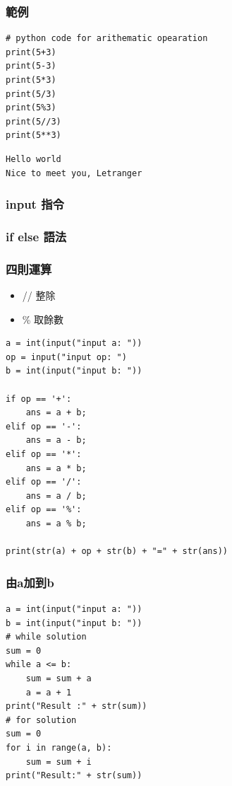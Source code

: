 \documentclass[a4paper,12pt]{article}
\begin{document}
\subsubsection{範例}
\label{sec:orgd1a297a}
\lstset{breaklines=true,language=Python,label= ,caption= ,captionpos=b,firstnumber=1,numbers=left}
\begin{lstlisting}
# python code for arithematic opearation
print(5+3)
print(5-3)
print(5*3)
print(5/3)
print(5%3)
print(5//3)
print(5**3)
\end{lstlisting}

\begin{verbatim}
Hello world
Nice to meet you, Letranger
\end{verbatim}

\subsubsection{input 指令}
\label{sec:org10aafd3}
\subsubsection{if else 語法}
\label{sec:org8dd342d}
\subsubsection{四則運算}
\label{sec:orgcf04b7e}
\begin{itemize}
\item // 整除\\
\item \% 取餘數\\
\end{itemize}
\lstset{breaklines=true,language=Python,label=計算機,caption= ,captionpos=b,firstnumber=1,numbers=left}
\begin{lstlisting}
a = int(input("input a: "))
op = input("input op: ")
b = int(input("input b: "))

if op == '+':
    ans = a + b;
elif op == '-':
    ans = a - b;
elif op == '*':
    ans = a * b;
elif op == '/':
    ans = a / b;
elif op == '%':
    ans = a % b;

print(str(a) + op + str(b) + "=" + str(ans))
\end{lstlisting}

\subsubsection{由a加到b}
\label{sec:org96acf98}
\lstset{breaklines=true,language=Python,label=計算機,caption= ,captionpos=b,firstnumber=1,numbers=left}
\begin{lstlisting}
a = int(input("input a: "))
b = int(input("input b: "))
# while solution
sum = 0
while a <= b:
    sum = sum + a
    a = a + 1
print("Result :" + str(sum))
# for solution
sum = 0
for i in range(a, b):
    sum = sum + i
print("Result:" + str(sum))
\end{lstlisting}
\end{document}
